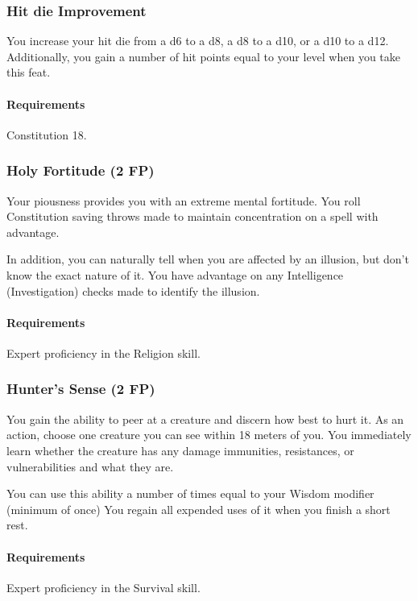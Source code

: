 \subsubsection{Hit die Improvement} \label{feat::hitdieimprovement}
    You increase your hit die from a d6 to a d8, a d8 to a d10, or a d10 to a d12.
    Additionally, you gain a number of hit points equal to your level when you take this feat.
    \paragraph{Requirements} Constitution 18.
\subsubsection{Holy Fortitude (2 FP)} \label{feat::holyfortitude}
    Your piousness provides you with an extreme mental fortitude.
    You roll Constitution saving throws made to maintain concentration on a spell with advantage.

    In addition, you can naturally tell when you are affected by an illusion, but don't know the exact nature of it.
    You have advantage on any Intelligence (Investigation) checks made to identify the illusion.
    \paragraph{Requirements} Expert proficiency in the Religion skill.
\subsubsection{Hunter's Sense (2 FP)} \label{feat::hunterssense}
    You gain the ability to peer at a creature and discern how best to hurt it.
    As an action, choose one creature you can see within 18 meters of you.
    You immediately learn whether the creature has any damage immunities, resistances, or vulnerabilities and what they are.

    You can use this ability a number of times equal to your Wisdom modifier (minimum of once)
     You regain all expended uses of it when you finish a short rest.
    \paragraph{Requirements} Expert proficiency in the Survival skill.
